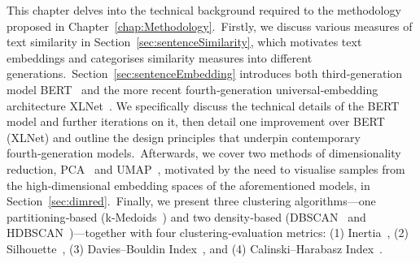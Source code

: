 \documentclass[10pt,oneside]{report}
\begin{document}
This chapter delves into the technical background required to the methodology proposed in Chapter \ref{chap:Methodology}. Firstly, we discuss various measures of text similarity in Section \ref{sec:sentenceSimilarity}, which motivates text embeddings and categorises similarity measures into different generations. Section \ref{sec:sentenceEmbedding} introduces both third‑generation model BERT \cite{devlin2019bert} and the more recent fourth‑generation universal‐embedding architecture XLNet \cite{yang2019xlnet}. We specifically discuss the technical details of the BERT model and further iterations on it, then detail one improvement over BERT (XLNet) and outline the design principles that underpin contemporary fourth‑generation models. Afterwards, we cover two methods of dimensionality reduction,  PCA \cite{pearson1901liii,hotelling1933analysis} and UMAP \cite{mcinnes2018umap}, motivated by the need to visualise samples from the high‑dimensional embedding spaces of the aforementioned models, in Section \ref{sec:dimred}. Finally, we present three clustering algorithms—one partitioning‑based (k‑Medoids \cite{}) and two density‑based (DBSCAN \cite{ester1996density} and HDBSCAN \cite{campello2013density})—together with four clustering‑evaluation metrics: (1) Inertia \cite{}, (2) Silhouette \cite{rousseeuw1987silhouettes}, (3) Davies–Bouldin Index \cite{davies1979cluster}, and (4) Calinski–Harabasz Index \cite{calinski1974dendrite}.  \


\end{document}
